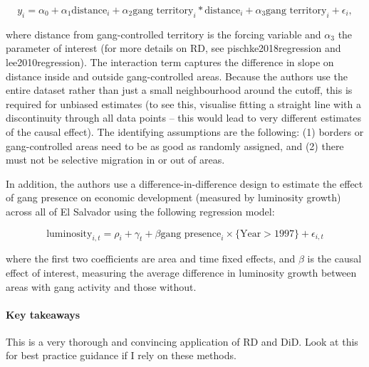 \begin{equation*}
	y_i = \alpha_0 + \alpha_1 \text{distance}_i + \alpha_2 \text{gang territory}_i * \text{distance}_i + \alpha_3 \text{gang territory}_i + \epsilon_i,
\end{equation*}

where distance from gang-controlled territory is the forcing variable and $\alpha_3$ the parameter of interest (for more details on RD, see pischke2018regression and lee2010regression). The interaction term captures the difference in slope on distance inside and outside gang-controlled areas. Because the authors use the entire dataset rather than just a small neighbourhood around the cutoff, this is required for unbiased estimates (to see this, visualise fitting a straight line with a discontinuity through all data points -- this would lead to very different estimates of the causal effect). The identifying assumptions are the following: (1) borders or gang-controlled areas need to be as good as randomly assigned, and (2) there must not be selective migration in or out of areas.

In addition, the authors use a difference-in-difference design to estimate the effect of gang presence on economic development (measured by luminosity growth) across all of El Salvador using the following regression model:

\begin{equation}
	\text{luminosity}_{i,t} = \rho_i + \gamma_t + \beta \text{gang presence}_i \times \{\text{Year} > 1997\}+ \epsilon_{i,t}
\end{equation}

where the first two coefficients are area and time fixed effects, and $\beta$ is the causal effect of interest, measuring the average difference in luminosity growth between areas with gang activity and those without.

\paragraph{Key takeaways}
This is a very thorough and convincing application of RD and DiD. Look at this for best practice guidance if I rely on these methods.
